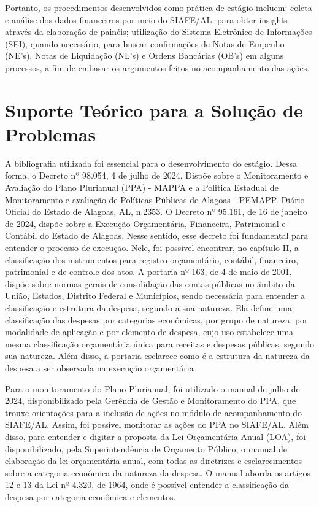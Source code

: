 \documentclass[12pt,a4paper]{article}
\begin{document}
	Portanto, os procedimentos desenvolvidos como prática de estágio incluem: coleta e análise dos dados financeiros por meio do SIAFE/AL, para obter insights através da elaboração de painéis; utilização do Sistema Eletrônico de Informações (SEI), quando necessário, para buscar confirmações de Notas de Empenho (NE’s), Notas de Liquidação (NL’s) e Ordens Bancárias (OB’s) em alguns processos, a fim de embasar os argumentos feitos no acompanhamento das ações.  

		
	\section{Suporte Teórico para a Solução de Problemas}
	\hspace*{1.5cm}A bibliografia utilizada foi essencial para o desenvolvimento do estágio. Dessa forma, o Decreto nº 98.054, 4 de julho de 2024, Dispõe sobre o Monitoramento e Avaliação do Plano Plurianual (PPA) - MAPPA e a Politica Estadual de Monitoramento e avaliação de Políticas Públicas de Alagoas - PEMAPP. Diário Oficial do Estado de Alagoas, AL, n.2353. O Decreto nº 95.161, de 16 de janeiro de 2024, dispõe sobre a Execução Orçamentária, Financeira, Patrimonial e Contábil do Estado de Alagoas. Nesse sentido, esse decreto foi fundamental para entender o processo de execução. Nele, foi possível encontrar, no capítulo II, a classificação dos instrumentos para registro orçamentário, contábil, financeiro, patrimonial e de controle dos atos. A portaria nº 163, de 4 de maio de 2001, dispõe sobre normas gerais de consolidação das contas públicas no âmbito da União, Estados, Distrito Federal e Municípios, sendo necessária para entender a classificação e estrutura da despesa, segundo a sua natureza. Ela define uma classificação das despesas por categorias econômicas, por grupo de natureza, por modalidade de aplicação e por elemento de despesa, cujo uso estabelece uma mesma classificação orçamentária única para receitas e despesas públicas, segundo sua natureza. Além disso, a portaria esclarece como é a estrutura da natureza da despesa a ser observada na execução orçamentária
	
	Para o monitoramento do Plano Plurianual, foi utilizado o manual de julho de 2024, disponibilizado pela Gerência de Gestão e Monitoramento do PPA, que trouxe orientações para a inclusão de ações no módulo de acompanhamento do SIAFE/AL. Assim, foi possível monitorar as ações do PPA no SIAFE/AL. Além disso, para entender e digitar a proposta da Lei Orçamentária Anual (LOA), foi disponibilizado, pela Superintendência de Orçamento Público, o manual de elaboração da lei orçamentária anual, com todas as diretrizes e esclarecimentos sobre a categoria econômica da natureza da despesa. O manual aborda os artigos 12 e 13 da Lei nº 4.320, de 1964, onde é possível entender a classificação da despesa por categoria econômica e elementos.
	
\end{document}
